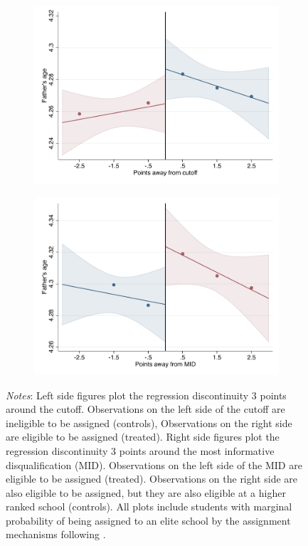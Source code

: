 \documentclass[oneside,11pt]{article}
\begin{document}
\begin{figure}[H]
\begin{center}
    \begin{subfigure}{0.475\textwidth}
        \centering
        \includegraphics[width=\textwidth]{04_Figures/rd_plot_tau_edad_pad_pdelta3.pdf}
    \end{subfigure}
    \begin{subfigure}{0.475\textwidth}
        \centering
        \includegraphics[width=\textwidth]{04_Figures/rd_plot_mid_edad_pad_pdelta3.pdf}
    \end{subfigure}
    \end{center}
    
\footnotesize
\textit{Notes}: Left side figures plot the regression discontinuity 3 points around the cutoff. Observations on the left side of the cutoff are ineligible to be assigned (controls), Observations on the right side are eligible to be assigned (treated). Right side figures plot the regression discontinuity 3 points around the most informative disqualification (MID). Observations on the left side of the MID are eligible to be assigned (treated). Observations on the right side are also eligible to be assigned, but they are also eligible at a higher ranked school (controls). All plots include students with marginal probability of being assigned to an elite school by the assignment mechanisms following \citet{abdulkadirouglu2022breaking}. 
\end{figure}
\end{document}
